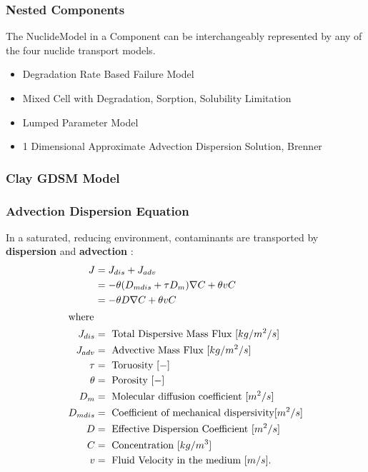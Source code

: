 
\begin{frame}
  \frametitle{Nested Components}
  The NuclideModel in a Component can be interchangeably represented by any of 
  the four nuclide transport models. 
    \begin{itemize}
      \item Degradation Rate Based Failure Model
      \item Mixed Cell with Degradation, Sorption, Solubility Limitation
      \item Lumped Parameter Model
      \item 1 Dimensional Approximate Advection Dispersion Solution, Brenner 
      \cite{brenner_diffusion_1962}
    \end{itemize}
\end{frame}

\begin{frame}
\frametitle{Clay GDSM Model}

\end{frame}

\begin{frame}
  \frametitle{Advection Dispersion Equation}
  \footnotesize{
    In a saturated, reducing environment, contaminants are transported by 
    \textbf{dispersion} and \textbf{advection} 
    \cite{schwartz_fundamentals_2004, 
    wang_introduction_1982, van_genuchten_analytical_1982}: 
    \begin{align}
      J &= J_{dis} + J_{adv}\nonumber\\
      &= -\theta(D_{mdis} + \tau D_m)\nabla C + \theta vC\nonumber\\ 
      &= -\theta D\nabla C + \theta vC \nonumber\\ 
      \label{unidirflow}
      \intertext{where}
      J_{dis} &= \mbox{ Total Dispersive Mass Flux }[kg/m^2/s]\nonumber\\
      J_{adv} &= \mbox{ Advective Mass Flux }[kg/m^2/s]\nonumber\\
      \tau &= \mbox{ Toruosity }[-] \nonumber\\
      \theta &= \mbox{ Porosity }[-] \nonumber\\
      D_m &= \mbox{ Molecular diffusion coefficient }[m^2/s]\nonumber\\
      D_{mdis} &= \mbox{ Coefficient of mechanical dispersivity}[m^2/s]\nonumber\\
      D &= \mbox{ Effective Dispersion Coefficient }[m^2/s]\nonumber\\
      C &= \mbox{ Concentration }[kg/m^3]\nonumber\\
      v &= \mbox{ Fluid Velocity in the medium }[m/s].\nonumber
    \end{align}
    }

\end{frame}

